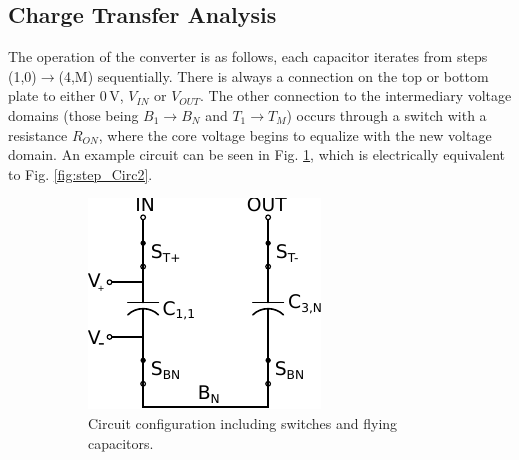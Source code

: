 \documentclass[conference]{IEEEtran}
\begin{document}
	\subsection{Charge Transfer Analysis}
	The operation of the converter is as follows, each capacitor iterates from steps (1,0)$\rightarrow$(4,M) sequentially. There is always a connection on the top or bottom plate to either 0$\,$V, $V_{IN}$ or $V_{OUT}$. The other connection to the intermediary voltage domains (those being $B_1 \rightarrow B_N$ and $T_1 \rightarrow T_M$) occurs through a switch with a resistance $R_{ON}$, where the core voltage begins to equalize with the new voltage domain. An example circuit can be seen in Fig. \ref{fig:step_Circ1}, which is electrically equivalent to Fig. \ref{fig:step_Circ2}. 
	
	\begin{figure}
		\centering
		\begin{subfigure}{0.45\linewidth}
			\centering
			\includegraphics[width=\textwidth]{Figures/step2_Circ.pdf}
			\caption{Circuit configuration including switches and flying capacitors.}
			\label{fig:step_Circ1}
		\end{subfigure}
		\hfill
		\begin{subfigure}{0.45\linewidth}
			\centering

\end{subfigure}
\end{figure}
\end{document}

